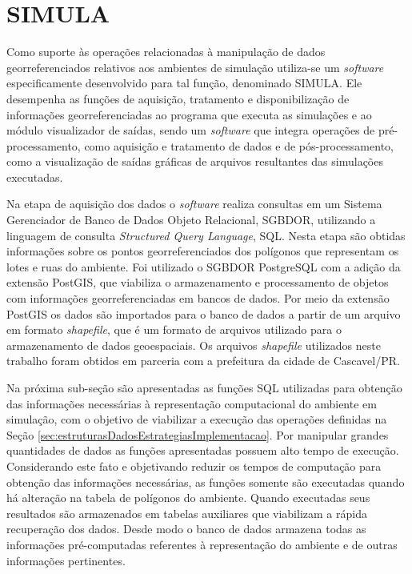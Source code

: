 \section{SIMULA}
\label{sec:SIMULA}

Como suporte às operações relacionadas à manipulação de dados georreferenciados relativos aos ambientes de simulação utiliza-se um \textit{software} especificamente desenvolvido para tal função, denominado SIMULA. Ele desempenha as funções de aquisição, tratamento e disponibilização de informações georreferenciadas ao programa que executa as simulações e ao módulo visualizador de saídas, sendo um \textit{software} que integra operações de pré-processamento, como aquisição e tratamento de dados e de pós-processamento, como a visualização de saídas gráficas de arquivos resultantes das simulações executadas. 

Na etapa de aquisição dos dados o \textit{software} realiza consultas em um Sistema Gerenciador de Banco de Dados Objeto Relacional, SGBDOR, utilizando a linguagem de consulta \textit{Structured Query Language}, SQL. Nesta etapa são obtidas informações sobre os pontos georreferenciados dos polígonos que representam os lotes e ruas do ambiente. Foi utilizado o SGBDOR PostgreSQL com a adição da extensão PostGIS, que viabiliza o armazenamento e processamento de objetos com informações georreferenciadas em bancos de dados. Por meio da extensão PostGIS os dados são importados para o banco de dados a partir de um arquivo em formato \textit{shapefile}, que é um formato de arquivos utilizado para o armazenamento de dados geoespaciais. Os arquivos \textit{shapefile} utilizados neste trabalho foram obtidos em parceria com a prefeitura da cidade de Cascavel/PR. 

Na próxima sub-seção são apresentadas as funções SQL utilizadas para obtenção das informações necessárias à representação computacional do ambiente em simulação, com o objetivo de viabilizar a execução das operações definidas na Seção \ref{sec:estruturasDadosEstrategiasImplementacao}. Por manipular grandes quantidades de dados as funções apresentadas possuem alto tempo de execução. Considerando este fato e objetivando reduzir os tempos de computação para obtenção das informações necessárias, as funções somente são executadas quando há alteração na tabela de polígonos do ambiente. Quando executadas seus resultados são armazenados em tabelas auxiliares que viabilizam a rápida recuperação dos dados. Desde modo o banco de dados armazena todas as informações pré-computadas referentes à representação do ambiente e de outras informações pertinentes. 

